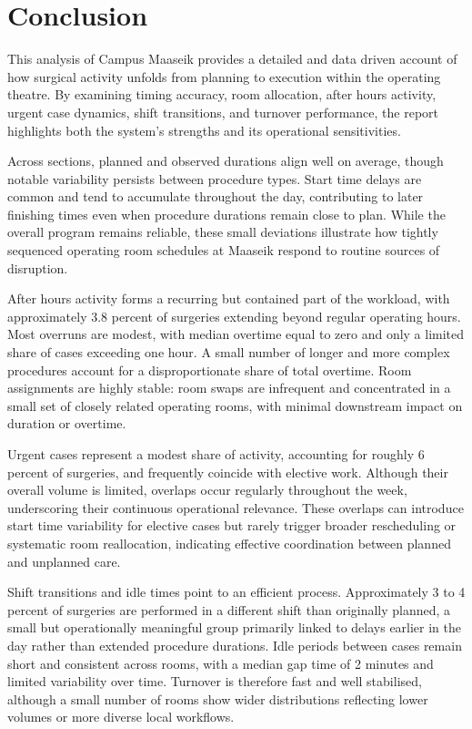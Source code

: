 \documentclass[
]{article}
\begin{document}
\section{Conclusion}\label{conclusion}

This analysis of Campus Maaseik provides a detailed and data driven
account of how surgical activity unfolds from planning to execution
within the operating theatre. By examining timing accuracy, room
allocation, after hours activity, urgent case dynamics, shift
transitions, and turnover performance, the report highlights both the
system's strengths and its operational sensitivities.

Across sections, planned and observed durations align well on average,
though notable variability persists between procedure types. Start time
delays are common and tend to accumulate throughout the day,
contributing to later finishing times even when procedure durations
remain close to plan. While the overall program remains reliable, these
small deviations illustrate how tightly sequenced operating room
schedules at Maaseik respond to routine sources of disruption.

After hours activity forms a recurring but contained part of the
workload, with approximately 3.8 percent of surgeries extending beyond
regular operating hours. Most overruns are modest, with median overtime
equal to zero and only a limited share of cases exceeding one hour. A
small number of longer and more complex procedures account for a
disproportionate share of total overtime. Room assignments are highly
stable: room swaps are infrequent and concentrated in a small set of
closely related operating rooms, with minimal downstream impact on
duration or overtime.

Urgent cases represent a modest share of activity, accounting for
roughly 6 percent of surgeries, and frequently coincide with elective
work. Although their overall volume is limited, overlaps occur regularly
throughout the week, underscoring their continuous operational
relevance. These overlaps can introduce start time variability for
elective cases but rarely trigger broader rescheduling or systematic
room reallocation, indicating effective coordination between planned and
unplanned care.

Shift transitions and idle times point to an efficient process.
Approximately 3 to 4 percent of surgeries are performed in a different
shift than originally planned, a small but operationally meaningful
group primarily linked to delays earlier in the day rather than extended
procedure durations. Idle periods between cases remain short and
consistent across rooms, with a median gap time of 2 minutes and limited
variability over time. Turnover is therefore fast and well stabilised,
although a small number of rooms show wider distributions reflecting
lower volumes or more diverse local workflows.
\end{document}
